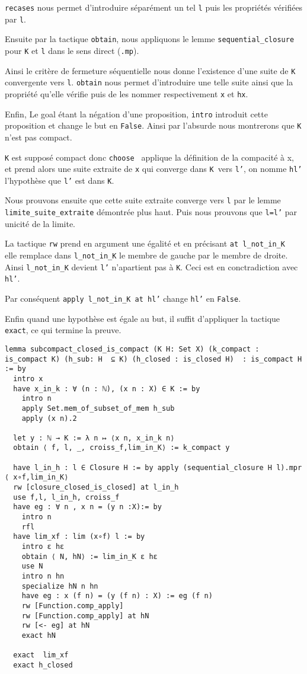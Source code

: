 \documentclass[a4paper, 12pt]{article}
\newcommand{\lean}[1]{\texttt{#1}}
\begin{document}
\lean{recases} nous permet d'introduire séparément un tel \lean{l} puis les propriétés vérifiées par \lean{l}.

Ensuite par la tactique \lean{obtain}, nous appliquons le lemme \lean{sequential_closure} pour \lean{K} et \lean{l} dans le sens direct (\lean{.mp}).

Ainsi le critère de fermeture séquentielle nous donne l'existence d'une suite de \lean{K} convergente vers \lean{l}. \lean{obtain} nous permet d'introduire une telle suite ainsi que la propriété qu'elle vérifie puis de les nommer respectivement \lean{x} et \lean{hx}.

Enfin, Le goal étant la négation d'une proposition, \lean{intro} introduit cette proposition et change le but en \lean{False}. Ainsi par l'absurde nous montrerons que \lean{K} n'est pas compact. 

\lean{K} est supposé compact donc \lean{choose } applique la définition de la compacité à x, et prend alors une suite extraite de \lean{x} qui converge dans \lean{K }vers \lean{l'}, on nomme \lean{hl'} l'hypothèse que \lean{l'} est dans \lean{K}.

Nous prouvons ensuite que cette suite extraite converge vers \lean{l} par le lemme \lean{limite_suite_extraite} démontrée plus haut. Puis nous prouvons que \lean{l=l'} par unicité de la limite. 

La tactique \lean{rw} prend en argument une égalité et en précisant \lean{at l_not_in_K } elle remplace dans \lean{l_not_in_K} le membre de gauche par le membre de droite. Ainsi \lean{l_not_in_K} devient \lean{l'} n'apartient pas à \lean{K}. Ceci est en conctradiction avec \lean{hl'}. 

Par conséquent \lean{apply l_not_in_K at hl'} change \lean{hl'} en \lean{False}.

Enfin quand une hypothèse est égale au but, il suffit d'appliquer la tactique \lean{exact}, ce qui termine la preuve.





\begin{verbatim}   
lemma subcompact_closed_is_compact (K H: Set X) (k_compact : is_compact K) (h_sub: H  ⊆ K) (h_closed : is_closed H)  : is_compact H := by
  intro x
  have x_in_k : ∀ (n : ℕ), (x n : X) ∈ K := by
    intro n
    apply Set.mem_of_subset_of_mem h_sub
    apply (x n).2

  let y : ℕ → K := λ n ↦ ⟨x n, x_in_k n⟩
  obtain ⟨ f, l, _, croiss_f,lim_in_K⟩ := k_compact y

  have l_in_h : l ∈ Closure H := by apply (sequential_closure H l).mpr  ⟨ x∘f,lim_in_K⟩
  rw [closure_closed_is_closed] at l_in_h
  use f,l, l_in_h, croiss_f
  have eg : ∀ n , x n = (y n :X):= by
    intro n
    rfl
  have lim_xf : lim (x∘f) l := by
    intro ε hε
    obtain ⟨ N, hN⟩ := lim_in_K ε hε
    use N
    intro n hn
    specialize hN n hn
    have eg : x (f n) = (y (f n) : X) := eg (f n)
    rw [Function.comp_apply]
    rw [Function.comp_apply] at hN
    rw [<- eg] at hN
    exact hN
    
  exact  lim_xf
  exact h_closed
\end{verbatim}
\end{document}

